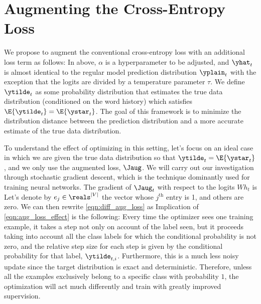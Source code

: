 \section{Augmenting the Cross-Entropy Loss}

We propose to augment the conventional cross-entropy loss with an additional loss term as follows:
In above, $\alpha$ is a hyperparameter to be adjusted, and $\yhat_t$ is almost identical to the regular model prediction distribution $\yplain_t$ with the exception that the logits are divided by a temperature parameter $\tau$.
We define $\ytilde_t$ as some probability distribution that estimates the true data distribution (conditioned on the word history) which satisfies $\E{\ytilde_t}=\E{\ystar_t}$.
The goal of this framework is to minimize the distribution distance between the prediction distribution and a more accurate estimate of the true data distribution.

To understand the effect of optimizing in this setting, let's focus on an ideal case in which we are given the true data distribution so that $\ytilde_t=\E{\ystar_t}$, and we only use the augmented loss, $\Jaug$.
We will carry out our investigation through stochastic gradient descent, which is the technique dominantly used for training neural networks.
The gradient of $\Jaug_t$ with respect to the logits $Wh_t$ is  
Let's denote by $e_j\in \reals^{|V|}$ the vector whose $j^\text{th}$ entry is 1, and others are zero. We can then rewrite
\eqref{eqn:diff_aug_loss} as
Implication of \eqref{eqn:aug_loss_effect} is the following: Every time the optimizer sees one training example, it takes a step not only on account of the label seen, but it proceeds taking into account all the class labels for which the conditional probability is not zero, and the relative step size for each step is given by the conditional probability for that label, $\ytilde_{t,i}$.
Furthermore, this is a much less noisy update since the target distribution is exact and deterministic.
Therefore, unless all the examples exclusively belong to a specific class with probability $1$, the optimization will act much differently and train with greatly improved supervision.

